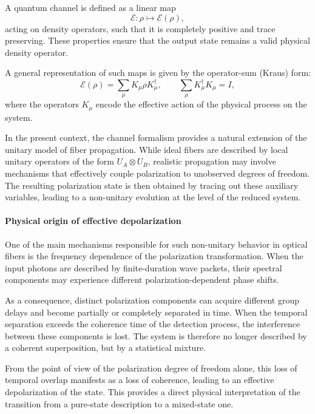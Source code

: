\documentclass[a4paper]{article}
\begin{document}
A quantum channel is defined as a linear map
\[
\mathcal{E} : \rho \mapsto \mathcal{E}(\rho),
\]
acting on density operators, such that it is completely positive and trace preserving. These properties ensure that the output state remains a valid physical density operator.

A general representation of such maps is given by the operator-sum (Kraus) form:
\[
\mathcal{E}(\rho)
=
\sum_{\mu} K_{\mu} \rho K_{\mu}^\dagger,
\qquad
\sum_{\mu} K_{\mu}^\dagger K_{\mu} = I,
\]
where the operators \(K_{\mu}\) encode the effective action of the physical process on the system.

\medskip

In the present context, the channel formalism provides a natural extension of the unitary model of fiber propagation. While ideal fibers are described by local unitary operators of the form \(U_A \otimes U_B\), realistic propagation may involve mechanisms that effectively couple polarization to unobserved degrees of freedom. The resulting polarization state is then obtained by tracing out these auxiliary variables, leading to a non-unitary evolution at the level of the reduced system.

\paragraph{Physical origin of effective depolarization}

One of the main mechanisms responsible for such non-unitary behavior in optical fibers is the frequency dependence of the polarization transformation. When the input photons are described by finite-duration wave packets, their spectral components may experience different polarization-dependent phase shifts.

As a consequence, distinct polarization components can acquire different group delays and become partially or completely separated in time. When the temporal separation exceeds the coherence time of the detection process, the interference between these components is lost. The system is therefore no longer described by a coherent superposition, but by a statistical mixture.

\medskip

From the point of view of the polarization degree of freedom alone, this loss of temporal overlap manifests as a loss of coherence, leading to an effective depolarization of the state. This provides a direct physical interpretation of the transition from a pure-state description to a mixed-state one.
\end{document}
